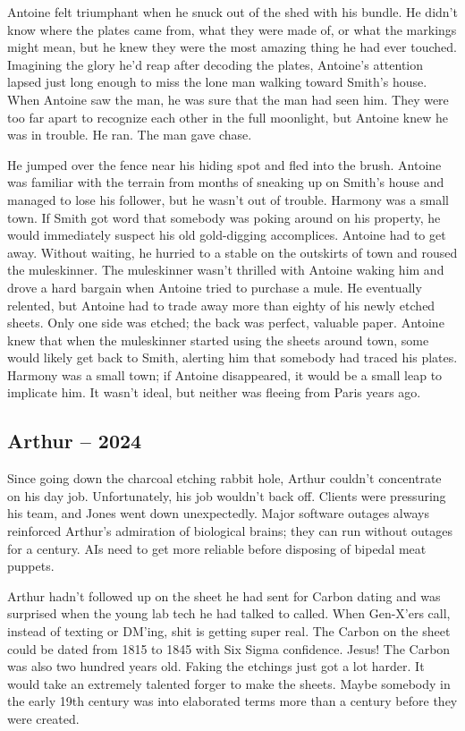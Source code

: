 Antoine felt triumphant when he snuck out of the shed with his bundle.
He didn't know where the plates came from, what they were made of, or
what the markings might mean, but he knew they were the most amazing
thing he had ever touched. Imagining the glory he'd reap after decoding
the plates, Antoine's attention lapsed just long enough to miss the lone
man walking toward Smith's house. When Antoine saw the man, he was sure
that the man had seen him. They were too far apart to recognize each
other in the full moonlight, but Antoine knew he was in trouble. He ran.
The man gave chase.

He jumped over the fence near his hiding spot and fled into the brush.
Antoine was familiar with the terrain from months of sneaking up on
Smith's house and managed to lose his follower, but he wasn't out of
trouble. Harmony was a small town. If Smith got word that somebody was
poking around on his property, he would immediately suspect his old
gold-digging accomplices. Antoine had to get away. Without waiting, he
hurried to a stable on the outskirts of town and roused the muleskinner.
The muleskinner wasn't thrilled with Antoine waking him and drove a hard
bargain when Antoine tried to purchase a mule. He eventually relented,
but Antoine had to trade away more than eighty of his newly etched
sheets. Only one side was etched; the back was perfect, valuable paper.
Antoine knew that when the muleskinner started using the sheets around
town, some would likely get back to Smith, alerting him that somebody
had traced his plates. Harmony was a small town; if Antoine disappeared,
it would be a small leap to implicate him. It wasn't ideal, but neither
was fleeing from Paris years ago.

\hypertarget{arthur-2024-4}{%
\subsection*{Arthur -- 2024}\label{arthur-2024-4}}

Since going down the charcoal etching rabbit hole, Arthur couldn't
concentrate on his day job. Unfortunately, his job wouldn't back off.
Clients were pressuring his team, and Jones went down unexpectedly.
Major software outages always reinforced Arthur's admiration of
biological brains; they can run without outages for a century. AIs need
to get more reliable before disposing of bipedal meat puppets.

Arthur hadn't followed up on the sheet he had sent for Carbon dating and
was surprised when the young lab tech he had talked to called. When
Gen-X'ers call, instead of texting or DM'ing, shit is getting super
real. The Carbon on the sheet could be dated from 1815 to 1845 with Six
Sigma confidence. Jesus! The Carbon was also two hundred years old.
Faking the etchings just got a lot harder. It would take an extremely
talented forger to make the sheets. Maybe somebody in the early 19th
century was into elaborated terms more than a century before they were
created.

